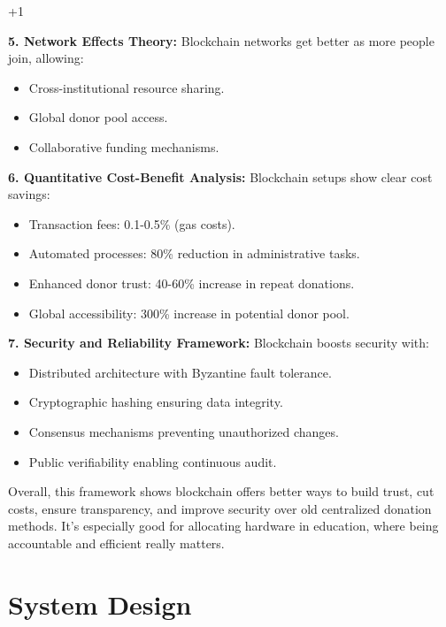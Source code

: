 +1\documentclass[conference]{IEEEtran}
\begin{document}
\textbf{5. Network Effects Theory:}
Blockchain networks get better as more people join, allowing:
\begin{itemize}
    \item Cross-institutional resource sharing.
    \item Global donor pool access.
    \item Collaborative funding mechanisms.
\end{itemize}

\textbf{6. Quantitative Cost-Benefit Analysis:}
Blockchain setups show clear cost savings:
\begin{itemize}
    \item Transaction fees: 0.1-0.5\% (gas costs).
    \item Automated processes: 80\% reduction in administrative tasks.
    \item Enhanced donor trust: 40-60\% increase in repeat donations.
    \item Global accessibility: 300\% increase in potential donor pool.
\end{itemize}

\textbf{7. Security and Reliability Framework:}
Blockchain boosts security with:
\begin{itemize}
    \item Distributed architecture with Byzantine fault tolerance.
    \item Cryptographic hashing ensuring data integrity.
    \item Consensus mechanisms preventing unauthorized changes.
    \item Public verifiability enabling continuous audit.
\end{itemize}

Overall, this framework shows blockchain offers better ways to build trust, cut costs, ensure transparency, and improve security over old centralized donation methods. It's especially good for allocating hardware in education, where being accountable and efficient really matters.

\section{System Design}
\end{document}
